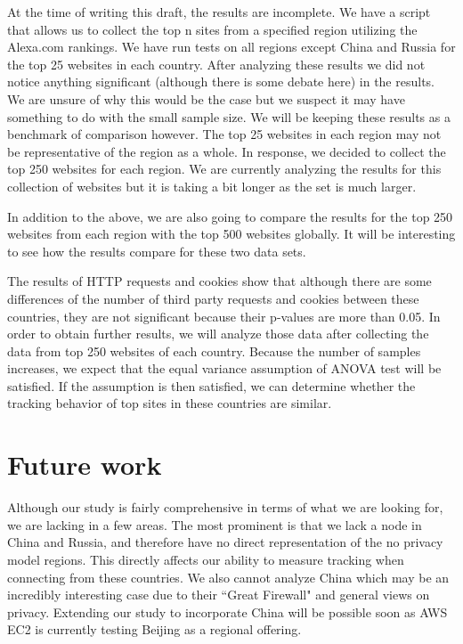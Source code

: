 \documentclass[12pt,draft,onecolumn]{IEEEtran}
\begin{document}
At the time of writing this draft, the results are incomplete. We have a script that allows us to collect the top n sites from a specified region utilizing the Alexa.com rankings. We have run tests on all regions except China and Russia for the top 25 websites in each country. After analyzing these results we did not notice anything significant (although there is some debate here) in the results. We are unsure of why this would be the case but we suspect it may have something to do with the small sample size. We will be keeping these results as a benchmark of comparison however. The top 25 websites in each region may not be representative of the region as a whole. In response, we decided to collect the top 250 websites for each region. We are currently analyzing the results for this collection of websites but it is taking a bit longer as the set is much larger.

In addition to the above, we are also going to compare the results for the top 250 websites from each region with the top 500 websites globally. It will be interesting to see how the results compare for these two data sets.

The results of HTTP requests and cookies show that although there are some differences of the number of third party requests and cookies between these countries, they are not significant because their p-values are more than 0.05. In order to obtain further results, we will analyze those data after collecting the data from top 250 websites of each country. Because the number of samples increases, we expect that the equal variance assumption of ANOVA test will be satisfied. If the assumption is then satisfied, we can determine whether the tracking behavior of top sites in these countries are similar. 

\section{Future work}
Although our study is fairly comprehensive in terms of what we are looking for, we are lacking in a few areas. The most prominent is that we lack a node in China and Russia, and therefore have no direct representation of the no privacy model regions. This directly affects our ability to measure tracking when connecting from these countries. We also cannot analyze China which may be an incredibly interesting case due to their ``Great Firewall" and general views on privacy. Extending our study to incorporate China will be possible soon as AWS EC2 is currently testing Beijing as a regional offering.
\end{document}
